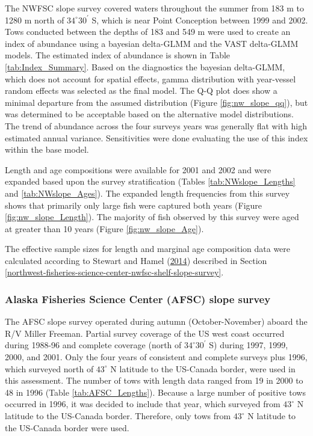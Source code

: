 \documentclass[12pt,]{article}
\begin{document}
The NWFSC slope survey covered waters throughout the summer from 183 m
to 1280 m north of \(34^\circ 30^\prime\) S, which is near Point
Conception between 1999 and 2002. Tows conducted between the depths of
183 and 549 m were used to create an index of abundance using a bayesian
delta-GLMM and the VAST delta-GLMM models. The estimated index of
abundance is shown in Table \ref{tab:Index_Summary}. Based on the
diagnostics the bayesian delta-GLMM, which does not account for spatial
effects, gamma distribution with year-vessel random effects was selected
as the final model. The Q-Q plot does show a minimal departure from the
assumed distribution (Figure \ref{fig:nw_slope_qq}), but was determined
to be acceptable based on the alternative model distributions. The trend
of abundance across the four surveys years was generally flat with high
estimated annual variance. Sensitivities were done evaluating the use of
this index within the base model.

Length and age compositions were available for 2001 and 2002 and were
expanded based upon the survey stratification (Tables
\ref{tab:NWslope_Lengths} and \ref{tab:NWslope_Ages}). The expanded
length frequencies from this survey shows that primarily only large fish
were captured both years (Figure \ref{fig:nw_slope_Length}). The
majority of fish observed by this survey were aged at greater than 10
years (Figure \ref{fig:nw_slope_Age}).

The effective sample sizes for length and marginal age composition data
were calculated according to Stewart and Hamel
(\protect\hyperlink{ref-stewart_bootstrapping_2014}{2014}) described in
Section
\ref{northwest-fisheries-science-center-nwfsc-shelf-slope-survey}.

\subsubsection{Alaska Fisheries Science Center (AFSC) slope
survey}\label{alaska-fisheries-science-center-afsc-slope-survey}

The AFSC slope survey operated during autumn (October-November) aboard
the R/V Miller Freeman. Partial survey coverage of the US west coast
occurred during 1988-96 and complete coverage (north of
\(34^\circ 30^\prime\) S) during 1997, 1999, 2000, and 2001. Only the
four years of consistent and complete surveys plus 1996, which surveyed
north of \(43^\circ\) N latitude to the US-Canada border, were used in
this assessment. The number of tows with length data ranged from 19 in
2000 to 48 in 1996 (Table \ref{tab:AFSC_Lengths}). Because a large
number of positive tows occurred in 1996, it was decided to include that
year, which surveyed from \(43^\circ\) N latitude to the US-Canada
border. Therefore, only tows from \(43^\circ\) N latitude to the
US-Canada border were used.
\end{document}
